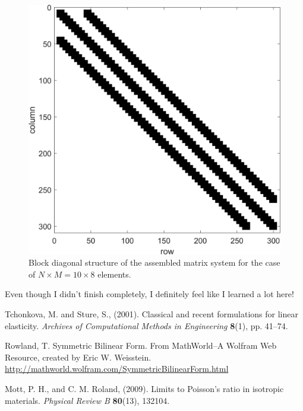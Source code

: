 \documentclass[11pt]{article}
\begin{document}
\begin{figure}[!htb]
  \centering
  \includegraphics[width=0.7\linewidth]{q2c_spy.png}
  \caption{Block diagonal structure of the assembled matrix system for the case of $N \times M = 10\times8$ elements.}
  \label{fig:M2c_spy}
\end{figure}

Even though I didn't finish completely, I definitely feel like I learned a lot here!

\clearpage
\begin{thebibliography}{9}
Tchonkova, M. and Sture, S., (2001). Classical and recent formulations for linear elasticity. \textit{Archives of Computational Methods in Engineering} \textbf{8}(1), pp. 41--74.

Rowland, T. Symmetric Bilinear Form. From MathWorld--A Wolfram Web Resource, created by Eric W. Weisstein. \url{http://mathworld.wolfram.com/SymmetricBilinearForm.html}

Mott, P. H., and C. M. Roland, (2009). Limits to Poisson's ratio in isotropic materials. \textit{Physical Review B} \textbf{80}(13), 132104.
\end{thebibliography}
\end{document}
